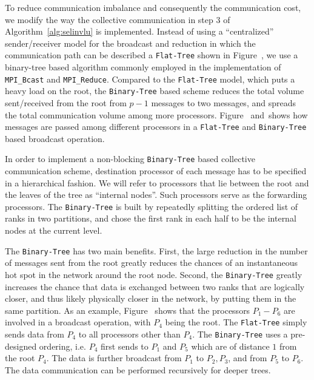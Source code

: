 \documentclass{acm_proc_article-sp}
\newcommand{\flattree}{\texttt{Flat-Tree}\xspace}
\newcommand{\btree}{\texttt{Binary-Tree}\xspace}
\begin{document}
To reduce communication imbalance and consequently the communication 
cost, we modify the way the collective communication in 
step 3 of Algorithm~\ref{alg:selinvlu} is implemented. Instead of using
a ``centralized'' sender/receiver model for the broadcast and
reduction in which the communication path can be described a \flattree
shown in Figure~, 
we use a binary-tree based algorithm commonly employed in the 
implementation of \texttt{MPI\_Bcast} and \texttt{MPI\_Reduce}.
Compared to the \flattree model, which puts a heavy load on the 
root, the \btree based scheme reduces the total
volume {sent/received} from the root from $p-1$ messages to two messages, 
and spreads the total communication volume among more processors.  
Figure~
and~shows 
how messages are passed among different processors in a \flattree and 
\btree based broadcast operation.


In order to implement a non-blocking \btree based collective communication 
scheme, destination processor of each message has to be specified
in a hierarchical fashion.  We will refer to processors that 
lie between the root and the leaves of the tree as ``internal nodes''. 
Such processors serve as the forwarding processors.
The \btree is built by repeatedly splitting the ordered list of ranks
in two partitions, and chose the first rank in each half to be the
internal nodes at the current level.

The \btree has two main benefits.  First, the large reduction in 
the number of messages sent from the root greatly reduces the chances of an 
instantaneous hot spot in the network around the root node.  Second, 
the \btree greatly increases the chance that data is exchanged between
two ranks that are logically closer, and thus likely physically closer in the network,
by putting them in the same partition.
As an example, Figure~ shows that the processors
$P_{1}-P_{6}$ are involved in a broadcast operation, with $P_{4}$ being
the root.  The \flattree simply sends data from $P_{4}$ to all
processors other than $P_{4}$. The \btree uses a pre-designed ordering,
i.e. $P_{4}$ first sends to $P_{1}$ and $P_{5}$ which are of
distance $1$ from the root $P_{4}$.  The data is further broadcast from
$P_{1}$ to $P_{2},P_{3}$, and from $P_{5}$ to $P_{6}$.  The data
communication can be performed recursively for deeper trees. 
\end{document}
